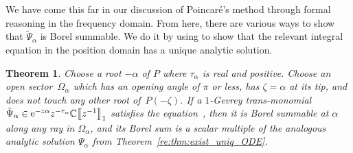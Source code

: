 \documentclass[10pt,a4paper]{amsart}
\newcommand{\C}{\mathbb{C}}
\newcommand{\series}[1]{\tilde{#1}}
\numberwithin{equation}{section}
\newtheorem{Theorem}{Theorem}[section]
\begin{document}
We have come this far in our discussion of Poincar\'e's method through formal reasoning in the frequency domain. From here, there are various ways to show that $\series{\Psi}_\alpha$ is Borel summable. We do it by using \cite[Theorem~4.6]{reg-sing-volterra} to show that the relevant integral equation in the position domain has a unique analytic solution.
\begin{Theorem}\label{thm:summability_ODE}
Choose a root $-\alpha$ of $P$ where $\tau_\alpha$ is real and positive. Choose an open sector~$\Omega_\alpha$ which has an opening angle of $\pi$ or less, has $\zeta = \alpha$ at its tip, and does not touch any other root of~$P(-\zeta)$. If a $1$-Gevrey trans-monomial $\series{\Psi}_\alpha \in {\rm e}^{-z\alpha} z^{-\tau_\alpha}\C\big\llbracket z^{-1} \big\rrbracket_1$ satisfies the equation~\smash{$\mathcal{P} \series{\Psi}_\alpha = 0$}, then it is Borel summable at $\alpha$ along any ray in $\Omega_\alpha$, and its Borel sum is a scalar multiple of the analogous analytic solution $\Psi_\alpha$ from Theorem~{\rm\ref{re:thm:exist_uniq_ODE}}.
\end{Theorem}
\end{document}
